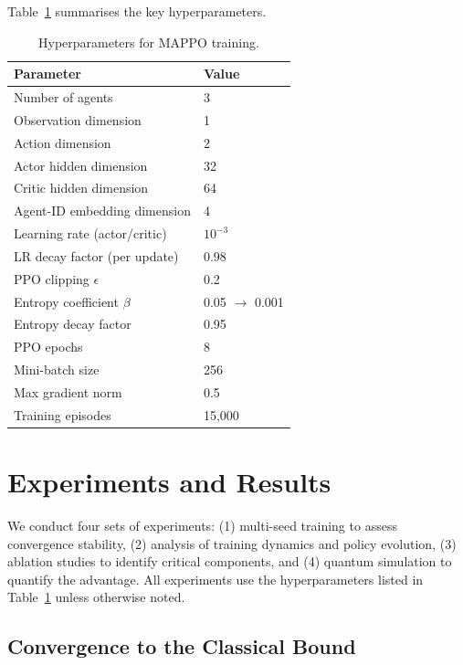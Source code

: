 \documentclass[conference]{IEEEtran}
\begin{document}
Table~\ref{tab:hyperparams} summarises the key hyperparameters.

\begin{table}[htbp]
\centering
\caption{Hyperparameters for MAPPO training.\label{tab:hyperparams}}
\begin{tabular}{@{}ll@{}}
\toprule
\textbf{Parameter} & \textbf{Value} \\
\midrule
Number of agents            & 3 \\
Observation dimension       & 1 \\
Action dimension            & 2 \\
Actor hidden dimension      & 32 \\
Critic hidden dimension     & 64 \\
Agent-ID embedding dimension & 4 \\
Learning rate (actor/critic)& $10^{-3}$ \\
LR decay factor (per update)& 0.98 \\
PPO clipping $\epsilon$     & 0.2 \\
Entropy coefficient $\beta$ & 0.05 $\to$ 0.001 \\
Entropy decay factor        & 0.95 \\
PPO epochs                  & 8 \\
Mini-batch size             & 256 \\
Max gradient norm           & 0.5 \\
Training episodes           & 15,000 \\
\bottomrule
\end{tabular}
\end{table}

\section{Experiments and Results}

We conduct four sets of experiments: (1) multi-seed training to assess convergence stability, (2) analysis of training dynamics and policy evolution, (3) ablation studies to identify critical components, and (4) quantum simulation to quantify the advantage. All experiments use the hyperparameters listed in Table~\ref{tab:hyperparams} unless otherwise noted.

\subsection{Convergence to the Classical Bound}
\end{document}
